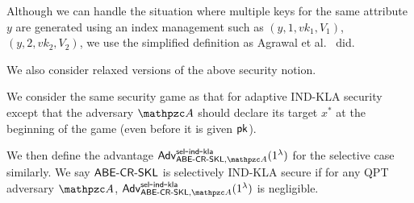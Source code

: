 \begin{remark}\label{remark:same_query_remark}
Although we can handle the situation where multiple keys for the same attribute $y$ are generated using an index management such as $(y,1,vk_1,V_1)$, $(y,2,vk_2,V_2)$, we use the simplified definition as Agrawal et al.~\cite{EC:AKNYY23} did.
\end{remark}

We also consider relaxed versions of the above security notion. 

\begin{definition}\label{def:sel_ind_ABE_SKL} We consider the same security
game as that for adaptive IND-KLA security except that the adversary
$\qA$ should declare its target $x^*$ at the beginning of the game
(even before it is given $\mathsf{pk}$).

We then define the advantage
$\advc{\ABESKL,\qA}{sel}{ind}{kla}(1^\secp)$ for the selective case
similarly. We say $\mathsf{ABE}\textrm{-}\mathsf{CR}\textrm{-}\mathsf{SKL}$ is selectively IND-KLA secure if for any
QPT adversary $\qA$, $\advc{\ABESKL,\qA}{sel}{ind}{kla}(1^\secp)$ is
negligible.    
\end{definition}



